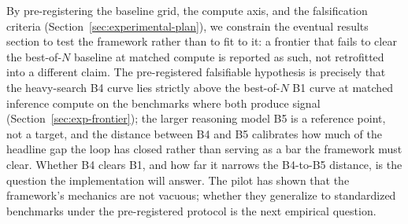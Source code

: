 By pre-registering the baseline grid, the compute axis, and the
falsification criteria (Section~\ref{sec:experimental-plan}), we
constrain the eventual results section to test the framework rather than
to fit to it: a frontier that fails to clear the best-of-$N$ baseline at
matched compute is reported as such, not retrofitted into a different
claim. The pre-registered falsifiable hypothesis is precisely that the
heavy-search B4 curve lies strictly above the best-of-$N$ B1 curve at
matched inference compute on the benchmarks where both produce signal
(Section~\ref{sec:exp-frontier}); the larger reasoning model B5 is a
reference point, not a target, and the distance between B4 and B5
calibrates how much of the headline gap the loop has closed rather than
serving as a bar the framework must clear. Whether B4 clears B1, and how
far it narrows the B4-to-B5 distance, is the question the implementation
will answer. The pilot has shown that the framework's mechanics are
not vacuous; whether they generalize to standardized benchmarks under the
pre-registered protocol is the next empirical question.
